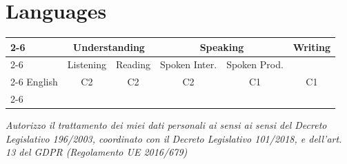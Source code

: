 \documentclass{moderncv}
\begin{document}
\section{Languages}
\def\arraystretch{1.7}
\begin{tabular}{p{4.5em} c | c | c | c | c}
	\cline{2-6}
	& \multicolumn{2}{c|}{\textbf{Understanding}} & \multicolumn{2}{c|}{\textbf{Speaking}} & \textbf{Writing} \\
	\cline{2-6}
	& Listening & Reading & Spoken Inter. & Spoken Prod. & \\
	\cline{2-6}
	\hfill English & C2 & C2 & C2 & C1 & C1 \\
	\cline{2-6}
\end{tabular}


\vspace*{\fill}
\textit{\footnotesize Autorizzo il trattamento dei miei dati personali ai sensi ai sensi del 
Decreto Legislativo 196/2003, coordinato con il Decreto Legislativo 101/2018, 
e dell'art. 13 del GDPR (Regolamento UE 2016/679)}
\end{document}
